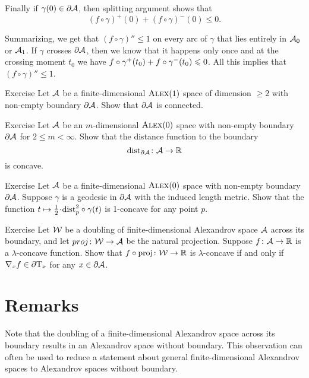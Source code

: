 Finally if $\gamma(0)\in\partial\mathcal{A}$, then splitting argument shows that 
\[(f\circ\gamma)^+(0)+(f\circ\gamma)^-(0)\le 0.\]

Summarizing, we get that $(f\circ\gamma)''\le 1$ on every arc of $\gamma$ that lies entirely in $\mathcal{A}_0$ or $\mathcal{A}_1$.
If $\gamma$ crosses $\partial \mathcal{A}$, then we know that it happens only once and at the crossing moment $t_0$ 
we have $f\circ\gamma^+(t_0)+f\circ\gamma^-(t_0)\leqslant 0$.
All this implies that $(f\circ\gamma)''\le 1$.
\qeds

\begin{thm}{Exercise}\label{ex:bry-connected}
Let $\mathcal{A}$ be a finite-dimensional $\textsc{Alex}(1)$ space of dimension $\ge 2$ with non-empty boundary $\partial\mathcal{A}$.
Show that $\partial\mathcal{A}$ is connected.
\end{thm}


\begin{thm}{Exercise}\label{ex:dist-to-bry}
Let $\mathcal{A}$ be an $m$-dimensional $\textsc{Alex}(0)$ space with non-empty boundary $\partial\mathcal{A}$
for $2\le m<\infty$.
Show that the distance function to the boundary
\[\mathrm{dist}_{\partial\mathcal{A}}\colon\mathcal{A}\to\mathbb{R}\]
is concave.
\end{thm}

\begin{thm}{Exercise}\label{ex:liberman}
Let $\mathcal{A}$ be a finite-dimensional $\textsc{Alex}(0)$ space with non-empty boundary $\partial\mathcal{A}$.
Suppose $\gamma$ is a geodesic in $\partial\mathcal{A}$ with the induced length metric.
Show that the function $t\mapsto \tfrac12\cdot\distfun_p^2\circ\gamma(t)$ is 1-concave for any point $p$. 
\end{thm}

\begin{thm}{Exercise}\label{ex:native}
Let $\mathcal{W}$ be a doubling of finite-dimensional Alexandrov space $\mathcal{A}$ across its boundary,
and let $proj\colon\mathcal{W}\to\mathcal{A}$ be the natural projection.
Suppose $f\colon\mathcal{A}\to\mathbb{R}$ is a $\lambda$-concave function.
Show that $f\circ\operatorname{\rm proj}\nolimits\colon\mathcal{W}\to\mathbb{R}$ is $\lambda$-concave if and only if $\nabla_xf\in \partial \mathrm{T}_x$ 
for any $x\in\partial \mathcal{A}$.
\end{thm}



\section{Remarks}

Note that the doubling of a finite-dimensional Alexandrov space across its boundary results in an Alexandrov space without boundary.
This observation can often be used to reduce a statement about general finite-dimensional Alexandrov spaces to  Alexandrov spaces without boundary.

